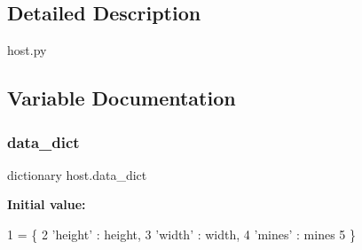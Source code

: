 \subsection{Detailed Description}
\begin{DoxyVerb}host.py
\end{DoxyVerb}
 

\subsection{Variable Documentation}
\mbox{\label{namespacehost_a4db7985dbc0e87100bf90263d891849e}} 
\subsubsection{\texorpdfstring{data\+\_\+dict}{data\_dict}}
{\footnotesize\ttfamily dictionary host.\+data\+\_\+dict}

{\bfseries Initial value\+:}
\begin{DoxyCode}
1 =  \{
2             \textcolor{stringliteral}{'height'} : height,
3             \textcolor{stringliteral}{'width'} : width,
4             \textcolor{stringliteral}{'mines'} : mines
5         \}
\end{DoxyCode}
